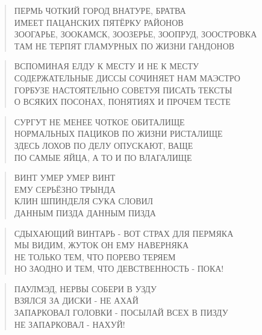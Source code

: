 \poemtitle{***}
\begin{verse}
ПЕРМЬ ЧОТКИЙ ГОРОД ВНАТУРЕ, БРАТВА\\
ИМЕЕТ ПАЦАНСКИХ ПЯТЁРКУ РАЙОНОВ\\
ЗООГАРЬЕ, ЗООКАМСК, ЗООЗЕРЬЕ, ЗООПРУД, ЗООСТРОВКА\\
ТАМ НЕ ТЕРПЯТ ГЛАМУРНЫХ ПО ЖИЗНИ ГАНДОНОВ
\end{verse}

\poemtitle{***}
\begin{verse}
ВСПОМИНАЯ ЕЛДУ К МЕСТУ И НЕ К МЕСТУ\\
СОДЕРЖАТЕЛЬНЫЕ ДИССЫ СОЧИНЯЕТ НАМ МАЭСТРО\\
ГОРБУЗЕ НАСТОЯТЕЛЬНО СОВЕТУЯ ПИСАТЬ ТЕКСТЫ\\
О ВСЯКИХ ПОСОНАХ, ПОНЯТИЯХ И ПРОЧЕМ ТЕСТЕ
\end{verse}

\poemtitle{***}
\begin{verse}
СУРГУТ НЕ МЕНЕЕ ЧОТКОЕ ОБИТАЛИЩЕ\\
НОРМАЛЬНЫХ ПАЦИКОВ ПО ЖИЗНИ РИСТАЛИЩЕ\\
ЗДЕСЬ ЛОХОВ ПО ДЕЛУ ОПУСКАЮТ, ВАЩЕ\\
ПО САМЫЕ ЯЙЦА, А ТО И ПО ВЛАГАЛИЩЕ
\end{verse}

\poemtitle{***}
\begin{verse}
ВИНТ УМЕР УМЕР ВИНТ\\
ЕМУ СЕРЬЁЗНО ТРЫНДА\\
КЛИН ШПИНДЕЛЯ СУКА СЛОВИЛ\\
ДАННЫМ ПИЗДА ДАННЫМ ПИЗДА
\end{verse}

\poemtitle{***}
\begin{verse}
СДЫХАЮЩИЙ ВИНТАРЬ - ВОТ СТРАХ ДЛЯ ПЕРМЯКА\\
МЫ ВИДИМ, ЖУТОК ОН ЕМУ НАВЕРНЯКА\\
НЕ ТОЛЬКО ТЕМ, ЧТО ПОРЕВО ТЕРЯЕМ\\
НО ЗАОДНО И ТЕМ, ЧТО ДЕВСТВЕННОСТЬ - ПОКА!
\end{verse}

\poemtitle{***}
\begin{verse}
ПАУЛМЭД, НЕРВЫ СОБЕРИ В УЗДУ\\
ВЗЯЛСЯ ЗА ДИСКИ - НЕ АХАЙ\\
ЗАПАРКОВАЛ ГОЛОВКИ - ПОСЫЛАЙ ВСЕХ В ПИЗДУ\\
НЕ ЗАПАРКОВАЛ - НАХУЙ!
\end{verse}


